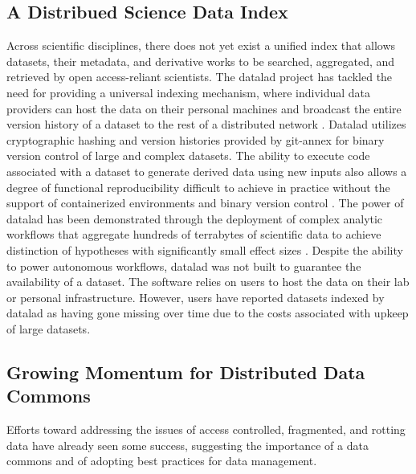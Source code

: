 \documentclass[conference]{IEEEtran}
\begin{document}
\subsection{A Distribued Science Data Index} Across scientific disciplines, there does not yet exist a unified index that allows datasets, their metadata, and derivative works to be searched, aggregated, and retrieved by open access-reliant scientists. The datalad project has tackled the need for providing a universal indexing mechanism, where individual data providers can host the data on their personal machines and broadcast the entire version history of a dataset to the rest of a distributed network \cite{DataLad}. Datalad utilizes cryptographic hashing and version histories provided by git-annex for binary version control of large and complex datasets. The ability to execute code associated with a dataset to generate derived data using new inputs also allows a degree of functional reproducibility difficult to achieve in practice without the support of containerized environments and binary version control \cite{wagner_hanke_2019}. The power of datalad has been demonstrated through the deployment of complex analytic workflows that aggregate hundreds of terrabytes of scientific data to achieve distinction of hypotheses with significantly small effect sizes \cite{Wagner2021.10.12.464122}.  Despite the ability to power autonomous workflows, datalad was not built to guarantee the availability of a dataset. The software relies on users to host the data on their lab or personal infrastructure. However, users have reported datasets indexed by datalad as having gone missing over time due to the costs associated with upkeep of large datasets.

\subsection{Growing Momentum for Distributed Data Commons}
Efforts toward addressing the issues of access controlled, fragmented, and rotting data have already seen some success, suggesting the importance of a data commons and of adopting best practices for data management.
\end{document}
